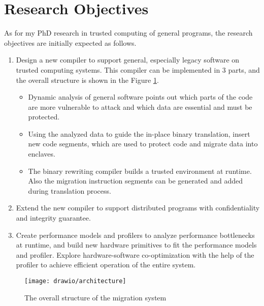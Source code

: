 \section{Research Objectives}
As for my PhD research in trusted computing of general programs, the research
objectives are initially expected as follows.
\begin{enumerate}[(1)]
    \item Design a new compiler to support general, especially legacy
    software on trusted computing systems. This compiler can be implemented
    in 3 parts, and the overall structure is shown in the Figure \ref{fig:arch}.
    \begin{itemize}
        \item Dynamic analysis of general software points out which parts of the code are
        more vulnerable to attack and which data are essential and must be protected.
        \item Using the analyzed data to guide the in-place binary translation,
        insert new code segments, which are used to protect code and migrate data into enclaves.
        \item The binary rewriting compiler builds a trusted environment at runtime.
        Also the migration instruction segments can be generated and added during translation process.
    \end{itemize}
    \item Extend the new compiler to support distributed programs with confidentiality and integrity guarantee.
    \item Create performance models and profilers to analyze performance bottlenecks at runtime,
    and build new hardware primitives to fit the performance models and profiler.
    Explore hardware-software co-optimization with the help of the profiler to
    achieve efficient operation of the entire system.
\end{enumerate}

\begin{figure}
    \centering
    \texttt{[image: drawio/architecture]}
    \caption{The overall structure of the migration system}
    \label{fig:arch}
\end{figure}